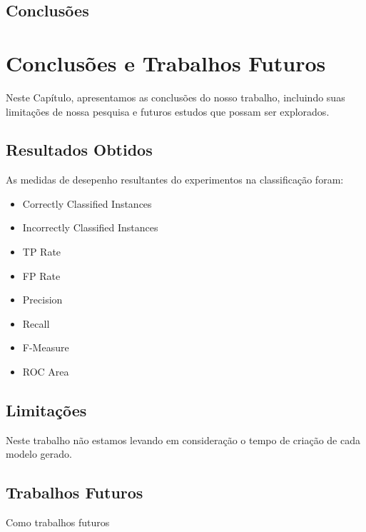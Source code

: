 \documentclass[
	12pt,				%
	openright,			%
	oneside,	
	a4paper,				%
	english,				%
	brazil				%
]{abntex2/abntex2} %
\begin{document}
	\section{Conclusões}
\chapter{Conclusões e Trabalhos Futuros}

	Neste Capítulo, apresentamos as conclusões do nosso trabalho, incluindo suas limitações de nossa pesquisa e futuros estudos que possam ser explorados.

	\section{Resultados Obtidos}

	As medidas de desepenho resultantes do experimentos na classificação foram: 
	
	\begin{itemize}
		\item Correctly Classified Instances
		\item Incorrectly Classified Instances
		\item TP Rate
		\item FP Rate
		\item Precision
		\item Recall
		\item F-Measure
		\item ROC Area
	\end{itemize}

	\section{Limitações}
	
	Neste trabalho não estamos levando em consideração o tempo de criação de cada modelo gerado.
	
	\section{Trabalhos Futuros}
	
	Como trabalhos futuros

\postextual
{}
%

\end{document}

